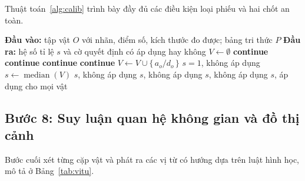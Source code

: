 Thuật toán~\ref{alg:calib} trình bày đầy đủ các điều kiện loại phiếu và hai chốt an toàn.


\begin{algorithm}[H]
\caption{Hiệu chỉnh tỉ lệ toàn ảnh theo bỏ phiếu trung vị}
\label{alg:calib}
\begin{algorithmic}[1]
\State \textbf{Đầu vào:} tập vật $O$ với nhãn, điểm số, kích thước đo được; bảng tri thức $P$
\State \textbf{Đầu ra:} hệ số tỉ lệ $s$ và cờ quyết định có áp dụng hay không
\State $V \gets \emptyset$
        \State \textbf{continue} 
    \EndIf
        \State \textbf{continue} 
    \EndIf
        \State \textbf{continue} 
    \EndIf
        \State \textbf{continue} 
    \EndIf
    \State $V \gets V \cup \{\, a_o / d_o \,\}$
\EndFor
{}
    \State \Return $s = 1$, không áp dụng
\EndIf
\State $s \gets \operatorname{median}(V)$
    \State \Return $s$, không áp dụng 
\EndIf
{}
    \State \Return $s$, không áp dụng 
\EndIf
{}
    \State \Return $s$, không áp dụng 
\EndIf
\State \Return $s$, áp dụng cho mọi vật
\end{algorithmic}
\end{algorithm}

\subsection{Bước 8: Suy luận quan hệ không gian và đồ thị cảnh}

Bước cuối xét từng cặp vật và phát ra các vị từ có hướng dựa trên luật hình học, mô tả ở
Bảng~\ref{tab:vitu}.

